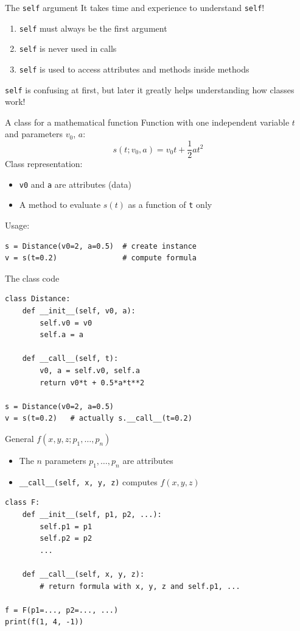 \begin{frame}{The \texttt{self} argument}
  It takes time and experience to understand \texttt{self}!
  \begin{enumerate}
    \item \texttt{self} must always be the first argument
    \item \texttt{self} is never used in calls
    \item \texttt{self} is used to access attributes and methods
          inside methods
  \end{enumerate}
  \begin{block}{}
    \texttt{self} is confusing at first, but later it greatly helps
    understanding how classes work!
  \end{block}
\end{frame}

\begin{frame}[fragile]{A class for a mathematical function}
  Function with one independent variable $t$ and parameters $v_0$, $a$:
  \[
    s(t; v_0, a) = v_0 t + \frac{1}{2} a t^2
  \]
  Class representation:
  \begin{itemize}
    \item \texttt{v0} and \texttt{a} are attributes (data)
    \item A method to evaluate $s(t)$ as a function of \texttt{t} only
  \end{itemize}
  Usage:
\begin{lstlisting}[style=pythoncompact]
s = Distance(v0=2, a=0.5)  # create instance
v = s(t=0.2)               # compute formula
\end{lstlisting}
\end{frame}

\begin{frame}[fragile]{The class code}
\begin{lstlisting}[style=pythoncompact]
class Distance:
    def __init__(self, v0, a):
        self.v0 = v0
        self.a = a

    def __call__(self, t):
        v0, a = self.v0, self.a
        return v0*t + 0.5*a*t**2

s = Distance(v0=2, a=0.5)
v = s(t=0.2)   # actually s.__call__(t=0.2)
\end{lstlisting}
\end{frame}

\begin{frame}[fragile]{General $f(x,y,z; p_1,\ldots,p_n)$}
  \begin{itemize}
    \item The $n$ parameters $p_1,\ldots,p_n$ are attributes
    \item \texttt{\_\_call\_\_(self, x, y, z)} computes $f(x,y,z)$
  \end{itemize}
\begin{lstlisting}[style=pythonTiny]
class F:
    def __init__(self, p1, p2, ...):
        self.p1 = p1
        self.p2 = p2
        ...

    def __call__(self, x, y, z):
        # return formula with x, y, z and self.p1, ...

f = F(p1=..., p2=..., ...)
print(f(1, 4, -1))
\end{lstlisting}
\end{frame}
